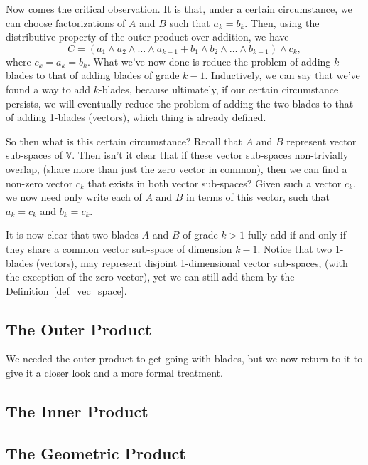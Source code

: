 \documentclass[12pt]{article}
\newcommand{\V}{\mathbb{V}}
\begin{document}
Now comes the critical observation.  It is that, under a certain circumstance, we
can choose factorizations of $A$ and $B$ such that $a_k=b_k$.  Then, using
the distributive property of the outer product over addition, we have
\begin{equation}
C = (a_1\wedge a_2\wedge\dots\wedge a_{k-1}+b_1\wedge b_2\wedge\dots\wedge b_{k-1})\wedge c_k,
\end{equation}
where $c_k=a_k=b_k$.  What we've now done is reduce the problem of adding
$k$-blades to that of adding blades of grade $k-1$.  Inductively, we can say that we've
found a way to add $k$-blades, because ultimately, if our certain circumstance persists,
we will eventually reduce the problem of adding the two blades to that
of adding 1-blades (vectors), which thing is already defined.

So then what is this certain circumstance?  Recall that $A$ and $B$ represent
vector sub-spaces of $\V$.  Then isn't it clear that if these vector sub-spaces
non-trivially overlap, (share more than just the zero vector in common), then we can find
a non-zero vector $c_k$ that exists in both vector sub-spaces?  Given such a
vector $c_k$, we now need only write each of $A$ and $B$ in terms of this
vector, such that $a_k=c_k$ and $b_k=c_k$.

It is now clear that two blades $A$ and $B$ of grade $k>1$ fully add if and only if they
share a common vector sub-space of dimension $k-1$.  Notice that
two 1-blades (vectors), may represent disjoint 1-dimensional vector sub-spaces,
(with the exception of the zero vector), yet we can still add them by
the Definition~\ref{def_vec_space}.

\subsection{The Outer Product}

We needed the outer product to get going with blades, but we now
return to it to give it a closer look and a more formal treatment.

\subsection{The Inner Product}

\subsection{The Geometric Product}
\end{document}
